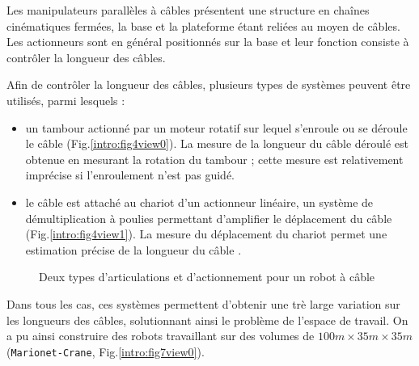 Les manipulateurs parallèles à câbles présentent une structure en chaînes cinéma\-tiques fermées, la base et la plateforme étant reliées au moyen de câbles. Les actionneurs sont en général positionnés sur la base et leur fonction consiste à contrôler la longueur des câbles.

Afin de contrôler la longueur des câbles, plusieurs types de systèmes peuvent être utilisés, parmi lesquels :
\begin{itemize}
 \item un tambour actionné par un moteur rotatif sur lequel s'enroule ou se déroule le câble (Fig.\ref{intro:fig4view0}). La mesure de la longueur du câble déroulé est obtenue en mesurant la rotation du tambour ; cette mesure est relativement imprécise si l'enroulement n'est pas guidé.
 \item le câble est attaché au chariot d'un actionneur linéaire, un système de démultiplication à poulies permettant d'amplifier le déplacement du câble (Fig.\ref{intro:fig4view1}). La mesure du déplacement du chariot permet une estimation précise de la longueur du câble \cite{merlet2008}. 
\end{itemize}

\begin{figure}[!ht]
  \centering
       \hfill
    \caption{\footnotesize Deux types d'articulations et d'actionnement pour un robot à câble}
\label{intro:fig4}
\end{figure}

Dans tous les cas, ces systèmes permettent d'obtenir une trè large variation sur les longueurs des câbles, solutionnant ainsi le problème de l'espace de travail. On a pu ainsi construire des robots travaillant sur des volumes de $100m\times35m\times35m$ ({\tt Marionet-Crane}, Fig.\ref{intro:fig7view0}).

